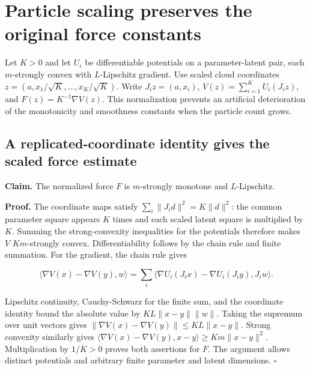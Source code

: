 \documentclass[11pt,a4paper]{report}
\begin{document}
\section{\texorpdfstring{Particle scaling preserves the original force constants}{Particle scaling preserves the original force constants}}


Let \(K>0\) and let \(U_i\) be differentiable potentials on a parameter-latent pair, each \(m\)-strongly convex with \(L\)-Lipschitz gradient. Use scaled cloud coordinates \(z=(a,x_1/\sqrt K,\ldots,x_K/\sqrt K)\). Write \(J_i z=(a,x_i)\), \(V(z)=\sum_{i=1}^KU_i(J_i z)\), and \(F(z)=K^{-1}\nabla V(z)\). This normalization prevents an artificial deterioration of the monotonicity and smoothness constants when the particle count grows.

\subsection{\texorpdfstring{A replicated-coordinate identity gives the scaled force estimate}{A replicated-coordinate identity gives the scaled force estimate}}


\textbf{Claim.} The normalized force \(F\) is \(m\)-strongly monotone and \(L\)-Lipschitz.



\textbf{Proof.} The coordinate maps satisfy \(\sum_i\|J_i d\|^2=K\|d\|^2\): the common parameter square appears \(K\) times and each scaled latent square is multiplied by \(K\). Summing the strong-convexity inequalities for the potentials therefore makes \(V\) \(Km\)-strongly convex. Differentiability follows by the chain rule and finite summation. For the gradient, the chain rule gives

\[\langle\nabla V(x)-\nabla V(y),w\rangle=\sum_i\langle\nabla U_i(J_ix)-\nabla U_i(J_iy),J_iw\rangle.\]

Lipschitz continuity, Cauchy-Schwarz for the finite sum, and the coordinate identity bound the absolute value by \(KL\|x-y\|\|w\|\). Taking the supremum over unit vectors gives \(\|\nabla V(x)-\nabla V(y)\|\le KL\|x-y\|\). Strong convexity similarly gives \(\langle\nabla V(x)-\nabla V(y),x-y\rangle\ge Km\|x-y\|^2\). Multiplication by \(1/K>0\) proves both assertions for \(F\). The argument allows distinct potentials and arbitrary finite parameter and latent dimensions. \(\square\)
\end{document}
